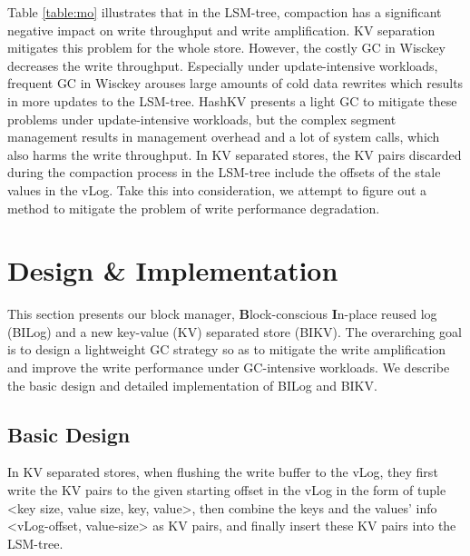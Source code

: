 \documentclass[sigconf]{acmart}
\begin{document}
Table \ref{table:mo} illustrates that in the LSM-tree, compaction has a significant negative impact on write throughput and write amplification. KV separation mitigates this problem for the whole store. However, the costly GC in Wisckey decreases the write throughput. Especially under update-intensive workloads, frequent GC in Wisckey arouses large amounts of cold data rewrites which results in more updates to the LSM-tree. HashKV presents a light GC to mitigate these problems under update-intensive workloads, but the complex segment management results in management overhead and a lot of system calls, which also harms the write throughput. In KV separated stores, the KV pairs discarded during the compaction process in the LSM-tree include the offsets of the stale values in the vLog. Take this into consideration, we attempt to figure out a method to mitigate the problem of write performance degradation.





\section{Design \& Implementation}
This section presents our block manager, \textbf{B}lock-conscious \textbf{I}n-place reused log (BILog) and a new key-value (KV) separated store (BIKV). The overarching goal is to design a lightweight GC strategy so as to mitigate the write amplification and improve the write performance under GC-intensive workloads. We describe the basic design and detailed implementation of BILog and BIKV.

\subsection{Basic Design} \label{bd}
In KV separated stores, when flushing the write buffer to the vLog, they first write the KV pairs to the given starting offset in the vLog in the form of tuple \textless key size, value size, key, value\textgreater, then combine the keys and the values’ info \textless vLog-offset, value-size\textgreater{} as KV pairs, and finally insert these KV pairs into the LSM-tree.
\end{document}

